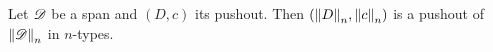 \documentclass[hott-all.tex]{subfiles}
\begin{document}
% 
% 
\begin{thm}
  Let $\Ddiag$ be a span and $(D,c)$ its pushout.
  Then $(\trunc nD,\trunc n c)$ is a pushout of $\trunc n\Ddiag$ in $n$-types.
\end{thm}
\end{document}
